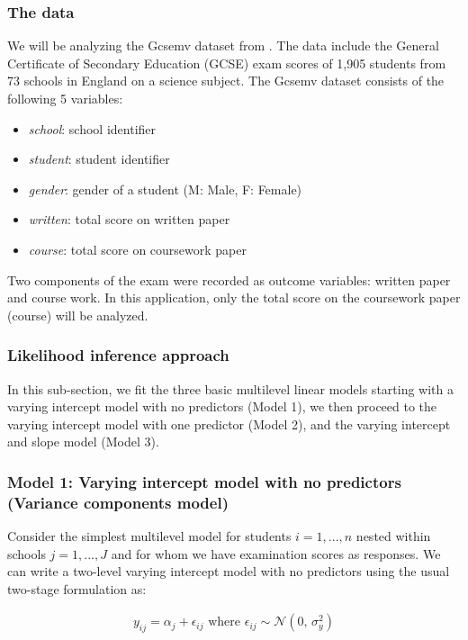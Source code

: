 \subsubsection{The data}
We will be analyzing the Gcsemv dataset from \cite{rasbash2000user}. The data include the General Certificate of Secondary Education (GCSE) exam scores of 1,905 students from 73 schools in England on a science subject. The Gcsemv dataset consists of the following 5 variables:
\begin{itemize}
	\item \textit{school}: school identifier
	\item \textit{student}: student identifier
	\item \textit{gender}: gender of a student (M: Male, F: Female)
	\item \textit{written}: total score on written paper
	\item \textit{course}: total score on coursework paper
\end{itemize}
Two components of the exam were recorded as outcome variables: written paper and course work. In this application, only the total score on the coursework paper (course) will be analyzed. 

\subsubsection{Likelihood inference approach}
In this sub-section, we fit the three basic multilevel linear models starting with a varying intercept model with no predictors (Model 1), we then proceed to the varying intercept model with one predictor (Model 2), and the varying intercept and slope model (Model 3).

\subsubsection*{Model 1: Varying intercept model with no predictors (Variance components model)}

Consider the simplest multilevel model for students $i=1,...,n$ nested within schools $j=1,...,J$ and for whom we have examination scores as responses. We can write a two-level varying intercept model with no predictors using the usual two-stage formulation as:

\begin{align}
	y_{ij} = \alpha_j + \epsilon_{ij} \text{ where } \epsilon_{ij} \sim \mathcal{N}(0,\,\sigma^{2}_y)
\end{align}

